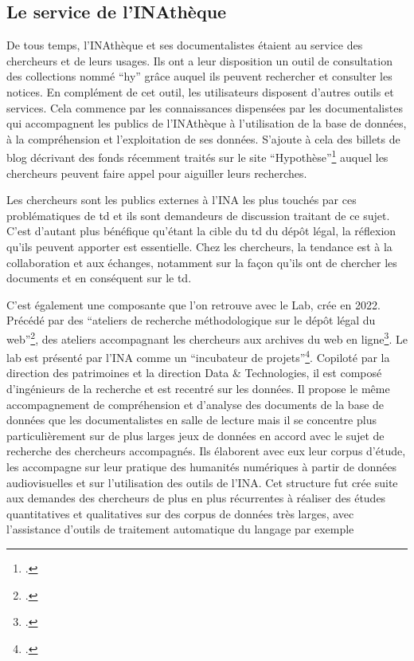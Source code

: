 \subsection{Le service de l'INAthèque}


De tous temps, l'INAthèque et ses documentalistes étaient au service des chercheurs et de leurs usages. Ils ont a leur disposition un outil de consultation des collections nommé \enquote{\gls{hy}} grâce auquel ils peuvent rechercher et consulter les notices. En complément de cet outil, les utilisateurs disposent d'autres outils et services. Cela commence par les connaissances dispensées par les documentalistes qui accompagnent les publics de l'INAthèque à l'utilisation de la base de données, à la compréhension et l'exploitation de ses données. S'ajoute à cela des billets de blog décrivant des fonds récemment traités sur le site \enquote{Hypothèse}\footcite[]{2026} auquel les chercheurs peuvent faire appel pour aiguiller leurs recherches. 

Les chercheurs sont les publics externes à l'INA les plus touchés par ces problématiques de \gls{td} et ils sont demandeurs de discussion traitant de ce sujet. C'est d'autant plus bénéfique qu'étant la cible du \gls{td} du dépôt légal, la réflexion qu'ils peuvent apporter est essentielle. Chez les chercheurs, la tendance est à la collaboration et aux échanges, notamment sur la façon qu'ils ont de chercher les documents et en conséquent sur le \gls{td}. 

C'est également une composante que l'on retrouve avec le Lab, crée en 2022. Précédé par des \enquote{ateliers de recherche méthodologique sur le dépôt légal du web}\footcite[][200]{bermès2024}, des ateliers accompagnant les chercheurs aux archives du web en ligne\footcite[]{webcorpora2017}. Le lab est présenté par l'INA comme un \enquote{incubateur de projets}\footcite{zotero-item-700}. Copiloté par la direction des patrimoines et la direction Data \& Technologies, il est composé d'ingénieurs de la recherche et est recentré sur les données. Il propose le même accompagnement de compréhension et d'analyse des documents de la base de données que les documentalistes en salle de lecture mais il se concentre plus particulièrement sur de plus larges jeux de données en accord avec le sujet de recherche des chercheurs accompagnés. Ils élaborent avec eux leur corpus d'étude, les accompagne sur leur pratique des humanités numériques à partir de données audiovisuelles et sur l'utilisation des outils de l'INA. Cet structure fut crée suite aux demandes des chercheurs de plus en plus récurrentes à réaliser des études quantitatives et qualitatives sur des corpus de données très larges, avec l'assistance d'outils de traitement automatique du langage par exemple


